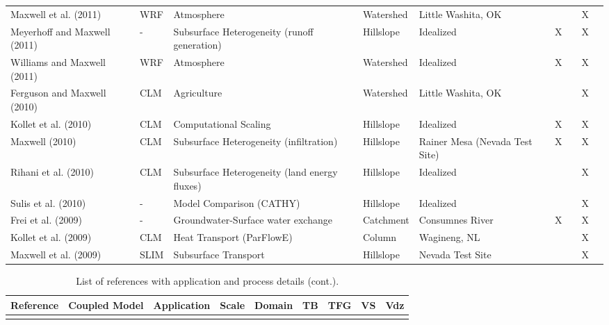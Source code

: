 {\begin{table}
\begin{tabular}{ l  p{1.5cm} p{2cm} p{1.5cm} p{1.5cm} | c | c | c | c }
\cite{MLMSWT10} Maxwell et al. (2011) & WRF & Atmosphere & Watershed  & Little Washita, OK  &   &   & X &     \\
\cite{Meyerhoff11} Meyerhoff and Maxwell (2011) & - & Subsurface Heterogeneity (runoff generation) & Hillslope  & Idealized  & X &   & X &     \\
\cite{Williams11} Williams and Maxwell (2011) & WRF & Atmosphere & Watershed & Idealized & X &   & X &     \\
\cite{FM10} Ferguson and Maxwell (2010) & CLM & Agriculture & Watershed & Little Washita, OK &   &   & X &     \\
\cite{KMWSVVS10} Kollet et al. (2010) & CLM & Computational Scaling & Hillslope & Idealized & X &   & X &     \\
\cite{M10} Maxwell (2010) & CLM & Subsurface Heterogeneity (infiltration) & Hillslope & Rainer Mesa (Nevada Test Site) & X &   & X &     \\
\cite{RMC10} Rihani et al. (2010) & CLM & Subsurface Heterogeneity (land energy fluxes) & Hillslope & Idealized  &   &   & X &     \\
\cite{SMPMPK10} Sulis et al. (2010) & - & Model Comparison (CATHY) & Hillslope & Idealized &   &   & X &     \\
\cite{FFKM09} Frei et al. (2009) & - & Groundwater-Surface water exchange & Catchment & Consumnes River & X &   & X &     \\
\cite{KCSMMB09} Kollet et al. (2009) & CLM & Heat Transport (ParFlowE) & Column & Wagineng, NL &   &   & X &     \\
\cite{MTK09} Maxwell et al. (2009) & SLIM & Subsurface Transport & Hillslope & Nevada Test Site &   &   & X &     \\

\end{tabular}
\label{pfref3}
\end{table}


\begin{table} \center
\renewcommand{\arraystretch}{2.5}
\center
\caption{List of \parflow{} references with application and process details (cont.).}
\begin{tabular}{ l  p{1.5cm} p{2cm} p{1.5cm} p{1.5cm} | c | c | c | c }
\bf{Reference} & \bf{Coupled Model} & \bf{Application} & \bf{Scale} & \bf{Domain} & \bf{TB} & \bf{TFG} & \bf{VS} & \bf{Vdz} \\ 
\hline{}
 

\end{tabular}
\end{table}}
